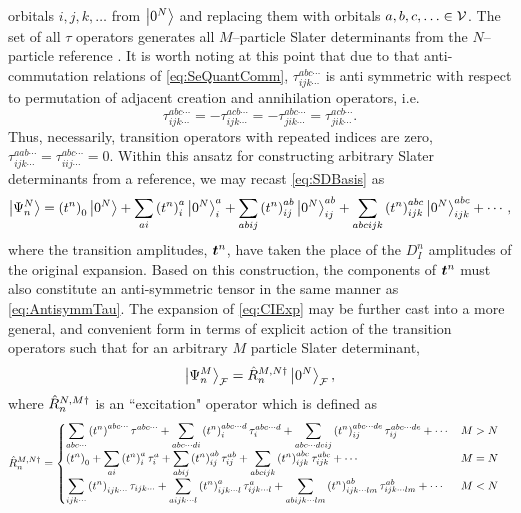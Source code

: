 orbitals $i,j,k,\ldots$ from $\left\vert 0^N \right\rangle$ and replacing them with orbitals $a,b,c,\ldots \in \mathcal{V}$. The set of all
$\tau$ operators generates all $M$--particle Slater determinants from the $N$--particle reference .
It is worth noting at this point that due to that anti-commutation relations of \cref{eq:SeQuantComm}, $\tau^{abc\cdots}_{ijk\cdots}$
is anti symmetric with respect to permutation of adjacent creation and annihilation operators, i.e.
\begin{equation}
  \label{eq:AntisymmTau}
  \tau^{abc\cdots}_{ijk\cdots} = - \tau^{acb\cdots}_{ijk\cdots} = - \tau^{abc\cdots}_{jik\cdots} = \tau^{acb\cdots}_{jik\cdots}.
\end{equation} 
Thus, necessarily, transition operators with repeated indices are zero, $\tau^{aab\cdots}_{ijk\cdots} = \tau^{abc\cdots}_{iij\cdots} = 0$.
Within this ansatz for constructing arbitrary Slater determinants from a reference, we may recast \cref{eq:SDBasis} 
as
\begin{equation}
  \label{eq:CIExp}
  \left\vert \Psi^N_n \right\rangle = \left(t^n\right)_0\left\vert 0^N \right\rangle + \sum_{ai} \left(t^n\right)_i^a \left\vert 0^N \right\rangle_i^a + 
                   \sum_{abij} \left(t^n\right)_{ij}^{ab} \left\vert 0^N \right\rangle_{ij}^{ab} + \sum_{abcijk} \left(t^n\right)_{ijk}^{abc} \left\vert 0^N \right\rangle_{ijk}^{abc} + \cdots,
\end{equation}
where the transition amplitudes, $\boldsymbol{t}^n$, have taken the place of the $D^n_I$ amplitudes of the original expansion. Based on this
construction, the components of $\boldsymbol{t}^n$ must also constitute an anti-symmetric tensor in the same manner as \cref{eq:AntisymmTau}.
The expansion of 
\cref{eq:CIExp} may be further cast into a more general, and convenient form in terms of explicit action of the transition
operators such that for an arbitrary $M$ particle Slater determinant,
\begin{equation}
  \label{eq:ExcitationOp}
  \left\vert \Psi^M_n \right\rangle_{\mathcal{F}} = \hat{R}_n^{M,N\dagger} \left\vert 0^N \right\rangle_{\mathcal{F}},
\end{equation}
where $\hat{R}_n^{N,M\dagger}$ is an ``excitation" operator which is defined as
\begin{align}
  \label{eq:ExOpExp}
&\hat{R}_n^{M,N\dagger} = 
  \begin{cases}
    \displaystyle \sum_{abc\cdots} \left( t^n \right)^{abc\cdots} \tau^{abc\cdots} + \sum_{abc\cdots di} \left( t^n \right)^{abc\cdots d}_i \tau^{abc\cdots d}_i +
      \sum_{abc\cdots deij} \left( t^n \right)^{abc\cdots de}_{ij} \tau^{abc\cdots de}_{ij} + \cdots & M > N \\
    \displaystyle\left( t^n \right)_0  + \sum_{ai} \left( t^n \right)^{a}_i \tau^{a}_i +
      \sum_{abij} \left( t^n \right)^{ab}_{ij} \tau^{ab}_{ij} + \sum_{abcijk} \left( t^n \right)^{abc}_{ijk} \tau^{abc}_{ijk} + \cdots & M = N \\
    \displaystyle \sum_{ijk\cdots} \left( t^n \right)_{ijk\cdots} \tau_{ijk\cdots} + \sum_{a ijk\cdots l} \left( t^n \right)^{a}_{ijk\cdots l} \tau^{a}_{ijk\cdots l} +
      \sum_{abijk\cdots lm} \left( t^n \right)^{ab}_{ijk\cdots lm} \tau^{ab}_{ijk\cdots lm} + \cdots & M < N \\
  \end{cases}
\end{align}
